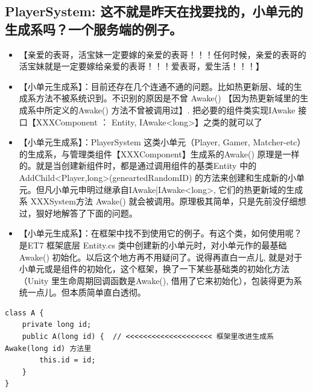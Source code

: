 \documentclass[9pt, b5paper]{article}
\begin{document}
\subsection{PlayerSystem: 这不就是昨天在找要找的，小单元的生成系吗？一个服务端的例子。}
\label{sec-9-2}
\begin{itemize}
\item 【亲爱的表哥，活宝妹一定要嫁的亲爱的表哥！！！任何时候，亲爱的表哥的活宝妹就是一定要嫁给亲爱的表哥！！！爱表哥，爱生活！！！】
\item 【小单元生成系】：目前还存在几个连通不通的问题。比如热更新层、域的生成系方法不被系统识到。不识别的原因是不曾 Awake() 【因为热更新域里的生成系中所定义的Awake() 方法不曾被调用过】. 把必要的组件类实现IAwake 接口【XXXComponent ： Entity, IAwake<long>】之类的就可以了
\item 【小单元生成系】：PlayerSystem 这类小单元（Player, Gamer, Matcher-etc）的生成系，与管理类组件【XXXComponent】生成系的Awake() 原理是一样的。就是当创建新组件时，都是通过调用组件的基类Entity 中的AddChild<Player,long>(geneartedRandomID) 的方法来创建和生成新的小单元。但凡小单元申明过继承自IAwake|IAwake<long>, 它们的热更新域的生成系 XXXSystem方法 Awake() 就会被调用。原理极其简单，只是先前没仔细想过，狠好地解答了下面的问题。
\item 【小单元生成系】：在框架中找不到使用它的例子。有这个类，如何使用呢？是ET7 框架底层 Entity.cs 类中创建新的小单元时，对小单元作的最基础Awake() 初始化。以后这个地方再不用疑问了。说得再直白一点儿, 就是对于小单元或是组件的初始化，这个框架，换了一下某些基础类的初始化方法（Unity 里生命周期回调函数是Awake(), 借用了它来初始化），包装得更为系统一点儿。但本质简单直白透彻。
\end{itemize}
\begin{verbatim}
class A {
    private long id;
    public A(long id) {  // <<<<<<<<<<<<<<<<<<<< 框架里改进生成系Awake(long id) 方法里
        this.id = id;
    }
}
\end{verbatim}
\end{document}
